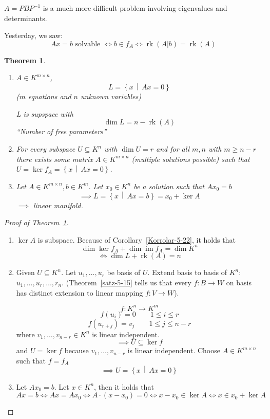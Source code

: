 \documentclass[a4paper,landscape,twocolumn]{article}
\newcommand\setdef[2]{\left\{#1\,\middle|\,#2\right\}}
\newtheorem{theorem}{Theorem}[section]
\DeclareMathOperator\image{im} %
\DeclareMathOperator\kernel{ker} %
\begin{document}
$A = P B P^{-1}$ is a much more difficult problem involving eigenvalues and determinants.

Yesterday, we saw:
\[
  Ax = b \text{ solvable }
  \iff b \in f_A
  \iff \operatorname{rk}(A | b) = \operatorname{rk}(A)
\]

\begin{theorem}
  \label{satz-6.44}
  \begin{enumerate}
    \item $A \in K^{m\times n}$,
      \[ L = \setdef{x}{Ax = 0} \]
      ($m$ equations and $n$ unknown variables)

      L is supspace with
      \[ \dim{L} = n - \operatorname{rk}(A) \]
      \enquote{Number of free parameters}
    \item
      For every subspace $U \subseteq K^n$ with $\dim{U} = r$
      and for all $m,n$ with $m \geq n - r$ there exists some
      matrix $A \in K^{m \times n}$ (multiple solutions possible)
      such that $U = \kernel{f_A} = \setdef{x}{Ax = 0}$.
    \item Let $A \in K^{m\times n}, b \in K^m$.
      Let $x_0 \in K^n$ be a solution such that $Ax_0 = b$
      \[ \implies L = \setdef{x}{Ax = b} = x_0 + \kernel{A} \]
      $\implies$ linear manifold.
  \end{enumerate}
\end{theorem}
\begin{proof}[Proof of Theorem~\ref{satz-6.44}]
  \begin{enumerate}
    \item
      $\kernel{A}$ is subspace. Because of Corollary~\ref{Korrolar-5-22}, it holds that
      \[ \dim{\kernel{f_A}} + \dim{\image{f_A}} = \dim{K^n} \]
      \[ \iff \dim{L} + \operatorname{rk}(A) = n \]
    \item
      Given $U \subseteq K^n$.
      Let $u_1, \ldots, u_r$ be basis of $U$.
      Extend basis to basis of $K^n$: $u_1, \ldots, u_r, \ldots, r_n$.
      (Theorem~\ref{satz-5-15} tells us that every $f: B \to W$ on basis
      has distinct extension to linear mapping $f: V \to W$).

      \[ f: K^n \to K^m \]
      \[ f(u_i) = 0 \qquad 1 \leq i \leq r \]
      \[ f(u_{r + j}) = v_j \qquad 1 \leq j \leq n - r \]
      where $v_1, \ldots, v_{n-r} \in K^n$ is linear independent.
      \[ \implies U \subseteq \kernel{f} \]
      and $U = \kernel{f}$ because $v_1, \ldots, v_{n-r}$ is linear independent.
      Choose $A \in K^{m\times n}$ such that $f = f_A$
      \[ \implies U = \setdef{x}{Ax = 0} \]
    \item Let $Ax_0 = b$.
      Let $x \in K^n$, then it holds that
      \[
        Ax = b \iff Ax = Ax_0 \iff A \cdot (x - x_0) = 0
        \iff x - x_0 \in \kernel{A}
        \iff x \in x_0 + \kernel{A}
      \]
  \end{enumerate}
\end{proof}
\end{document}
